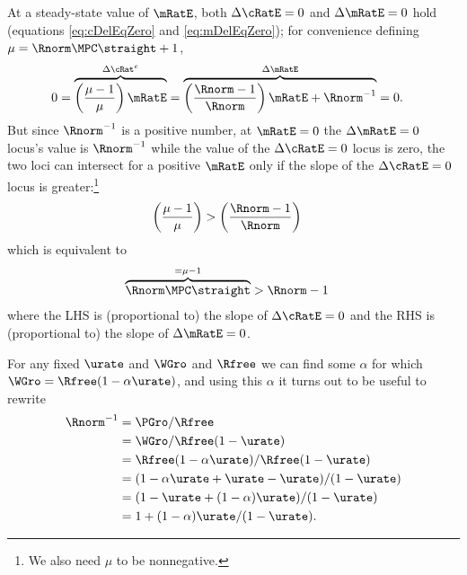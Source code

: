 \documentclass{handout}
\begin{document}
At a steady-state value of $\mRatE$, both $\dcEqZero$ and $\dmEqZero$ hold (equations \eqref{eq:cDelEqZero} and \eqref{eq:mDelEqZero}); for convenience defining $\mu = \Rnorm \MPCU \straight + 1$, 
\begin{equation}\begin{gathered}\begin{aligned}
  0 = \overbrace{\left(\frac{\mu-1}{\mu}\right) \mRatE}^{\Delta {\cRat}^{e} } & =  \overbrace{\left(\frac{\Rnorm-1}{\Rnorm}\right)\mRatE + \Rnorm^{-1}}^{\Delta \mRatE} = 0.
\end{aligned}\end{gathered}\end{equation}
But since $\Rnorm^{-1}$ is a positive number, at $\mRatE=0$ the $\dmEqZero$ locus's value is $\Rnorm^{-1}$ while the value of the $\dcEqZero$ locus is zero, the two loci can intersect for a positive $\mRatE$ only if the slope of the $\dcEqZero$ locus is greater:\footnote{We also need $\mu$ to be nonnegative.}
\begin{equation}\begin{gathered}\begin{aligned}
  \left(\frac{\mu-1}{\mu}\right) & >  \left(\frac{\Rnorm-1}{\Rnorm}\right) \label{eq:cDelEq0SlopeCond}
\end{aligned}\end{gathered}\end{equation}
which is equivalent to 
\begin{equation}\begin{gathered}\begin{aligned}
  \overbrace{\Rnorm \MPCU \straight}^{= \mu-1} & >   \Rnorm-1  \label{eq:cDelEq0SlopeCondAlt}
\end{aligned}\end{gathered}\end{equation}
where the LHS is (proportional to) the slope of $\dcEqZero$ and the RHS is (proportional to) the slope of $\dmEqZero$.

For any fixed $\urate$ and $\WGro$ and $\Rfree$ we can find some $\alpha$ for which $\WGro = \Rfree (1-\alpha \urate)$, and using this $\alpha$ it turns out to be useful to rewrite
\begin{equation}\begin{gathered}\begin{aligned}
  \Rnorm^{-1} & =  \PGro/\Rfree
\\ & =  \WGro/\Rfree(1-\urate)
\\ & =  \Rfree(1-\alpha \urate)/\Rfree(1-\urate)
\\ & =  (1-\alpha \urate + \urate - \urate)/(1-\urate)
\\ & =  (1-\urate+(1-\alpha) \urate)/(1-\urate)
\\ & =  1+(1-\alpha)\urate/(1-\urate) \label{eq:RnormFromAlpha}
.
\end{aligned}\end{gathered}\end{equation}
\end{document}
